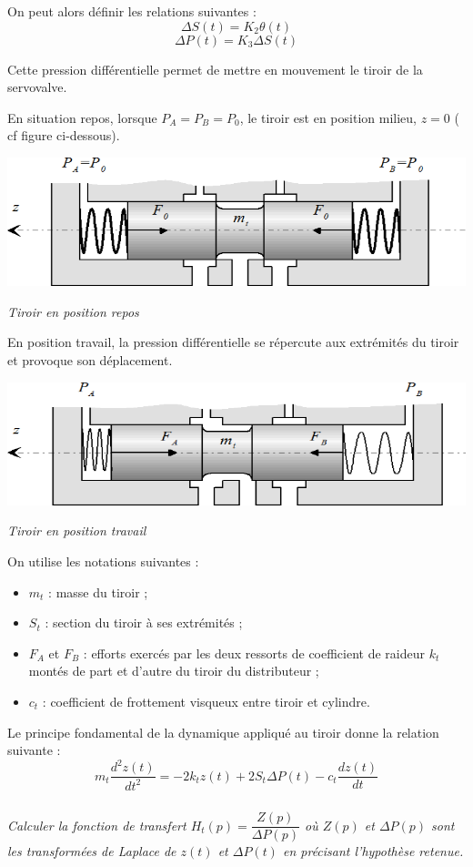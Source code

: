 \documentclass[10pt,fleqn]{article} %
\begin{document}
\begin{multicols}{2}
On peut alors définir les relations suivantes :
$$\Delta S (t)=K_2 \theta (t) $$
$$\Delta P (t)=K_3 \Delta  S(t)$$

Cette pression différentielle permet de mettre en mouvement le tiroir de la servovalve.

En situation repos, lorsque $P_A=P_B=P_0$, le tiroir est en position milieu, $z = 0$ ( cf figure ci-dessous).

\begin{center}
\includegraphics[width=.5\linewidth]{images/image10.png}

\textit{Tiroir en position repos}
\end{center}


En position travail, la pression différentielle se répercute aux extrémités du tiroir et provoque son
déplacement.

\begin{center}
\includegraphics[width=.5\linewidth]{images/image11.png}

\textit{Tiroir en position travail}
\end{center}

On utilise les notations suivantes :
\begin{itemize}
\item $m_t$ : masse du tiroir ;
\item $S_t$ : section du tiroir à ses extrémités ;
\item $F_A$ et $F_B$ : efforts exercés par les deux ressorts de coefficient de raideur $k_t$ montés de part et d’autre
du tiroir du distributeur ;
\item $c_t$ : coefficient de frottement visqueux entre tiroir et cylindre.
\end{itemize}

Le principe fondamental de la dynamique appliqué au tiroir donne la relation suivante :
$$
m_t\dfrac{d^2z(t)}{dt^2} = -2k_tz(t) + 2S_t\Delta P(t) -c_t \dfrac{dz(t)}{dt}
$$

\fi


\subparagraph{}
\textit{Calculer la fonction de transfert $H_t(p)=\dfrac{Z(p)}{\Delta P(p)}$ 
où $Z(p)$ et $\Delta P(p)$ sont les transformées de Laplace de $z(t)$ et 
$\Delta P(t)$ en précisant l'hypothèse retenue.}
\ifprof
\begin{corrige}


\end{corrige}
\end{multicols}
\end{document}
